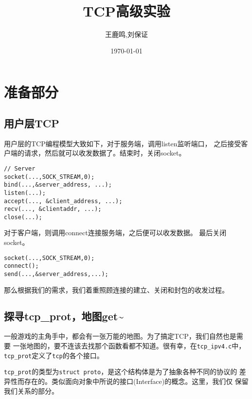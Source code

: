 \documentclass[11pt, a4paper,oneside]{book}
\theoremstyle{ocrenumbox}
\theoremstyle{purplenumbox}
\theoremstyle{blackbox}
\begin{document}
\pagestyle{empty} %
\title{TCP高级实验}
\author{王鹿鸣,刘保证}
\date{\today}
\maketitle
\setcounter{secnumdepth}{3}
\frontmatter
\tableofcontents

\mainmatter
\pagestyle{fancy}

\chapter{准备部分}

\minitoc

\section{用户层TCP}

用户层的TCP编程模型大致如下，对于服务端，调用listen监听端口，
之后接受客户端的请求，然后就可以收发数据了。结束时，关闭socket。

\begin{verbatim}
// Server
socket(...,SOCK_STREAM,0);
bind(...,&server_address, ...);
listen(...);
accept(..., &client_address, ...);
recv(..., &clientaddr, ...);
close(...);
\end{verbatim}

对于客户端，则调用connect连接服务端，之后便可以收发数据。
最后关闭socket。

\begin{verbatim}
socket(...,SOCK_STREAM,0);
connect();
send(...,&server_address,...);
\end{verbatim}

那么根据我们的需求，我们着重照顾连接的建立、关闭和封包的收发过程。

\section{探寻tcp\_prot，地图get\textasciitilde{}}

一般游戏的主角手中，都会有一张万能的地图。为了搞定TCP，我们自然也是需要
一张地图的，要不连该去找那个函数看都不知道。很有幸，在\texttt{tcp_ipv4.c}中，
\texttt{tcp_prot}定义了\texttt{tcp}的各个接口。

\texttt{tcp_prot}的类型为\texttt{struct proto}，是这个结构体是为了抽象各种不同的协议的
差异性而存在的。类似面向对象中所说的接口(Interface)的概念。这里，我们仅
保留我们关系的部分。
\end{document}
